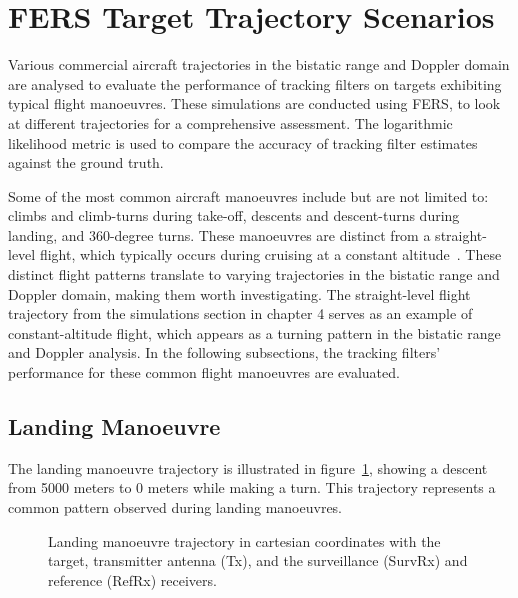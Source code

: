 \section{FERS Target Trajectory Scenarios}
Various commercial aircraft trajectories in the bistatic range and Doppler domain are analysed to evaluate the performance of tracking filters on targets exhibiting typical flight manoeuvres. These simulations are conducted using \ac{FERS}, to look at different trajectories for a comprehensive assessment. The logarithmic likelihood metric is used to compare the accuracy of tracking filter estimates against the ground truth.

Some of the most common aircraft manoeuvres include but are not limited to: climbs and climb-turns during take-off, descents and descent-turns during landing, and 360-degree turns. These manoeuvres are distinct from a straight-level flight, which typically occurs during cruising at a constant altitude~\cite{badick2021flight}. These distinct flight patterns translate to varying trajectories in the bistatic range and Doppler domain, making them worth investigating. The straight-level flight trajectory from the simulations section in chapter 4 serves as an example of constant-altitude flight, which appears as a turning pattern in the bistatic range and Doppler analysis. In the following subsections, the tracking filters' performance for these common flight manoeuvres are evaluated.


\subsection{Landing Manoeuvre}
The landing manoeuvre trajectory is illustrated in figure~\ref{fig:landing3D}, showing a descent from 5000 meters to 0 meters while making a turn. This trajectory represents a common pattern observed during landing manoeuvres.

\begin{figure}[H]
    \centering
    
    \caption{Landing manoeuvre trajectory in cartesian coordinates with the target, transmitter antenna (Tx), and the surveillance (SurvRx) and reference (RefRx) receivers.}
    \label{fig:landing3D}
\end{figure}

